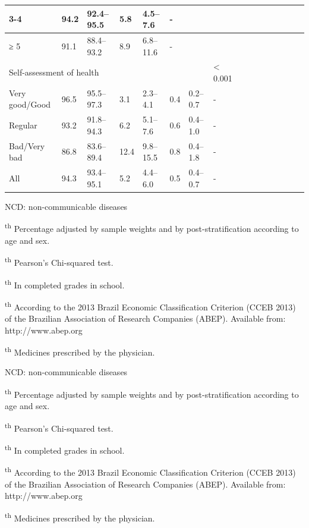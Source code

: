 \documentclass{article}
\begin{document}
\begin{tabular}{| l | l || || l | l | l | l | l || || l | l | l | l | l | l | l
| l | l |}
3-4
& 94.2
& 92.4–95.5
& 5.8
& 4.5–7.6
& \multicolumn{2}{l}{-}
&
\\ \hline

≥ 5
& 91.1
& 88.4–93.2
& 8.9
& 6.8–11.6
& \multicolumn{2}{l}{-}
&
\\ \hline

\multicolumn{7}{l}{Self-assessment of health}
& < 0.001
\\ \hline

Very good/Good
& 96.5
& 95.5–97.3
& 3.1
& 2.3–4.1
& 0.4
& 0.2–0.7
& -
\\ \hline

Regular
& 93.2
& 91.8–94.3
& 6.2
& 5.1–7.6
& 0.6
& 0.4–1.0
& -
\\ \hline

Bad/Very bad
& 86.8
& 83.6–89.4
& 12.4
& 9.8–15.5
& 0.8
& 0.4–1.8
& -
\\ \hline

All
& 94.3
& 93.4–95.1
& 5.2
& 4.4–6.0
& 0.5
& 0.4–0.7
& -
\\ \hline

\end{tabular}

NCD: non-communicable diseases

\textsuperscript{th}
Percentage adjusted by sample weights and by post-stratification according to
age and sex.

\textsuperscript{th}
Pearson’s Chi-squared test.

\textsuperscript{th}
In completed grades in school.

\textsuperscript{th}
According to the 2013 Brazil Economic Classification Criterion (CCEB 2013) of
the Brazilian Association of Research Companies (ABEP). Available from:
http://www.abep.org

\textsuperscript{th}
Medicines prescribed by the physician.

NCD: non-communicable diseases

\textsuperscript{th}
Percentage adjusted by sample weights and by post-stratification according to
age and sex.

\textsuperscript{th}
Pearson’s Chi-squared test.

\textsuperscript{th}
In completed grades in school.

\textsuperscript{th}
According to the 2013 Brazil Economic Classification Criterion (CCEB 2013) of
the Brazilian Association of Research Companies (ABEP). Available from:
http://www.abep.org

\textsuperscript{th}
Medicines prescribed by the physician.
\end{document}
